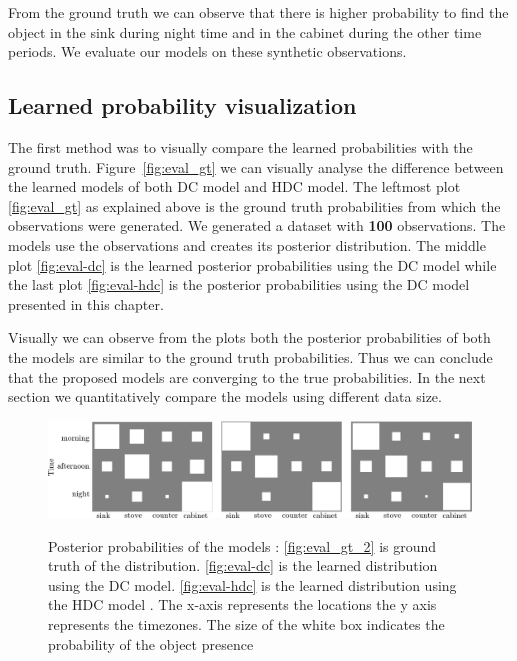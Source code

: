 From the ground truth we can observe that there is higher probability to find the object in the sink during night time and in the cabinet during the other time periods. We evaluate our models on these synthetic observations.


\subsection{Learned probability visualization}
The first method was to visually compare the learned probabilities with the ground truth.  Figure~\ref{fig:eval_gt} we can visually analyse the difference between the learned models of both DC model and HDC model. The leftmost plot \ref{fig:eval_gt} as explained above is the ground truth probabilities from which the observations were generated. We generated a dataset with \textbf{100} observations. The models use the observations and creates its posterior distribution. The middle plot \ref{fig:eval-dc} is the learned posterior probabilities using the DC model while the last plot \ref{fig:eval-hdc} is the posterior probabilities using the DC model presented in this chapter. 

Visually we can observe from the plots both the posterior probabilities of both the models are similar to the ground truth probabilities. Thus we can conclude that the proposed models are converging to the true probabilities. In the next section we quantitatively compare the models using different data size.

\begin{figure}
    \centering
    \includegraphics[width=\textwidth]{images/eval_gt_DC_HDC.png}
       
    \begin{minipage}[t]{.35\textwidth}
    \label{fig:eval_gt_2}
    \end{minipage}%
    \begin{minipage}[t]{.3\textwidth}
    \label{fig:eval-dc}
    \end{minipage}
    \begin{minipage}[t]{.25\textwidth}
    \label{fig:eval-hdc}
    \end{minipage}

\caption[Posterior probabilities of DC and HDC ]{Posterior probabilities of the models : \ref{fig:eval_gt_2} is ground truth of the distribution. \ref{fig:eval-dc} is the learned distribution using the DC model. \ref{fig:eval-hdc} is the learned distribution using the HDC  model . The x-axis represents the locations the y axis represents the timezones. The size of the white box indicates the probability of the object presence }\label{fig:eval-dc-hdc}
    
\end{figure}

